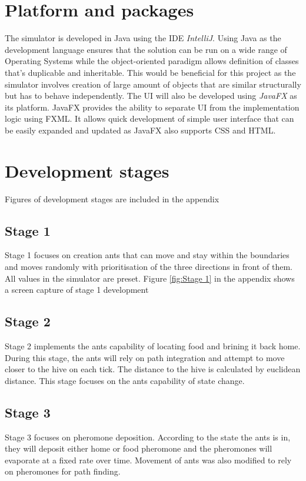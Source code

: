 \documentclass[a4paper, oneside, 11pt]{report}
\begin{document}
\section{Platform and packages}
The simulator is developed in Java using the IDE \textit{IntelliJ}. Using Java as the development language ensures that the solution can be run on a wide range of Operating Systems while the object-oriented paradigm allows definition of classes that's duplicable and inheritable. This would be beneficial for this project as the simulator involves creation of large amount of objects that are similar structurally but has to behave independently. The UI will also be developed using \textit{JavaFX} as its platform. JavaFX provides the ability to separate UI from the implementation logic using FXML. It allows quick development of simple user interface that can be easily expanded and updated as JavaFX also supports CSS and HTML.

\section{Development stages}
Figures of development stages are included in the appendix

\subsection{Stage 1}
Stage 1 focuses on creation ants that can move and stay within the boundaries and moves randomly with prioritisation of the three directions in front of them. All values in the simulator are preset. Figure \ref{fig:Stage 1} in the appendix shows a screen capture of stage 1 development

\subsection{Stage 2}
Stage 2 implements the ants capability of locating food and brining it back home. During this stage, the ants will rely on path integration and attempt to move closer to the hive on each tick. The distance to the hive is calculated by euclidean distance. This stage focuses on the ants capability of state change.

\subsection{Stage 3}
Stage 3 focuses on pheromone deposition. According to the state the ants is in, they will deposit either home or food pheromone and the pheromones will evaporate at a fixed rate over time. Movement of ants was also modified to rely on pheromones for path finding.
\end{document}
